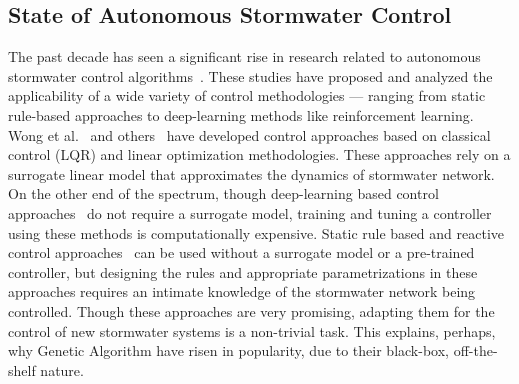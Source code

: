 \subsection{State of Autonomous Stormwater Control}
The past decade has seen a significant rise in research related to autonomous stormwater control algorithms~\cite{shishegar2018optimization}.
These studies have proposed and analyzed the applicability of a wide variety of control methodologies --- ranging from static rule-based approaches to deep-learning methods like reinforcement learning.
Wong et al.~\cite{Wong_Kerkez_2018} and others~\cite{Ocampo-Martinez_2015,joseph2014hybrid, Sun_Lorenz_2020, lund2020cso} have developed control approaches based on classical control (LQR) and linear optimization methodologies.
These approaches rely on a surrogate linear model that approximates the dynamics of stormwater network.
On the other end of the spectrum, though deep-learning based control approaches~\cite{Mullapudi_Lewis_Gruden_Kerkez_2020,Ochoa_Riano-Briceno_Quijano_Ocampo-Martinez_2019} do not require a surrogate model, training and tuning a controller using these methods is computationally expensive.
Static rule based\cite{schmitt2020simulation} and reactive control approaches~\cite{Troutman_2020} can be used without a surrogate model or a pre-trained controller, but designing the rules and appropriate parametrizations in these approaches requires an intimate knowledge of the stormwater network being controlled.
Though these approaches are very promising, adapting them for the control of new stormwater systems is a non-trivial task.
This explains, perhaps, why Genetic Algorithm have risen in popularity, due to their black-box, off-the-shelf nature. 


\

